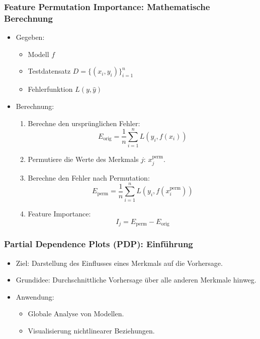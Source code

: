 \documentclass[aspectratio=1610, xcolor=dvipsnames, 9pt]{beamer}
\begin{document}
\begin{frame}
  \frametitle{Feature Permutation Importance: Mathematische Berechnung}
  \begin{itemize}
    \item Gegeben:
    \begin{itemize}
      \item Modell $f$
      \item Testdatensatz $D = \{(x_i, y_i)\}_{i=1}^n$
      \item Fehlerfunktion $L(y, \hat{y})$
    \end{itemize}
    \item Berechnung:
    \begin{enumerate}
      \item Berechne den ursprünglichen Fehler:
      \[
      E_{\text{orig}} = \frac{1}{n} \sum_{i=1}^n L(y_i, f(x_i))
      \]
      \item Permutiere die Werte des Merkmals $j$: $x_j^{\text{perm}}$.
      \item Berechne den Fehler nach Permutation:
      \[
      E_{\text{perm}} = \frac{1}{n} \sum_{i=1}^n L(y_i, f(x_i^{\text{perm}}))
      \]
      \item Feature Importance:
      \[
      I_j = E_{\text{perm}} - E_{\text{orig}}
      \]
    \end{enumerate}
  \end{itemize}
\end{frame}

\begin{frame}
  \frametitle{Partial Dependence Plots (PDP): Einführung}
  \begin{itemize}
    \item Ziel: Darstellung des Einflusses eines Merkmals auf die Vorhersage.
    \item Grundidee: Durchschnittliche Vorhersage über alle anderen Merkmale hinweg.
    \item Anwendung:
    \begin{itemize}
      \item Globale Analyse von Modellen.
      \item Visualisierung nichtlinearer Beziehungen.
    \end{itemize}
  \end{itemize}
\end{frame}
\end{document}
